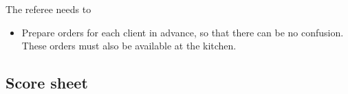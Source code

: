 The referee needs to
\begin{itemize}
  \item Prepare orders for each client in advance, so that there can be no confusion. These orders must also be available at the kitchen.
\end{itemize}



\newpage
\subsection{Score sheet}


